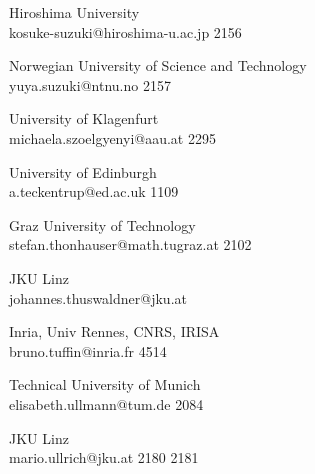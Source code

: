 \begin{multicols}{2}
 {Hiroshima University\\}%
 {kosuke-suzuki@hiroshima-u.ac.jp}%
 {2156} %
 {} %
 {} %
 {} %
 {} %

 {Norwegian University of Science and Technology\\}%
 {yuya.suzuki@ntnu.no}%
 {2157} %
 {} %
 {} %
 {} %
 {} %

 {University of Klagenfurt\\}%
 {michaela.szoelgyenyi@aau.at}%
 {2295} %
 {} %
 {} %
 {} %
 {} %

 {University of Edinburgh\\}%
 {a.teckentrup@ed.ac.uk}%
 {1109} %
 {} %
 {} %
 {} %
 {} %

 {Graz University of Technology\\}%
 {stefan.thonhauser@math.tugraz.at}%
 {2102} %
 {} %
 {} %
 {} %
 {} %

 {JKU Linz\\}%
 {johannes.thuswaldner@jku.at}%
 {} %
 {} %
 {} %
 {} %
 {} %

 {Inria, Univ Rennes, CNRS, IRISA\\}%
 {bruno.tuffin@inria.fr}%
 {4514} %
 {} %
 {} %
 {} %
 {} %

 {Technical University of Munich\\}%
 {elisabeth.ullmann@tum.de}%
 {2084} %
 {} %
 {} %
 {} %
 {} %

 {JKU Linz\\}%
 {mario.ullrich@jku.at}%
 {2180} %
 {2181} %
 {} %
 {} %
 {} %


\end{multicols}

